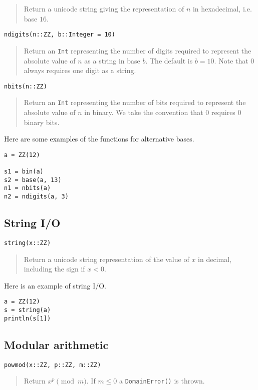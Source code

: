 \documentclass[a4paper,10pt]{article}
\newcommand{\code}{\lstinline}
\newcommand{\desc}[1]{\vspace{-3mm}\begin{quote}#1\end{quote}}
\begin{document}
{{{\desc{Return a unicode string giving the representation of $n$ in hexadecimal, i.e. base $16$.}

\begin{lstlisting}
ndigits(n::ZZ, b::Integer = 10)
\end{lstlisting}

\desc{Return an \code{Int} representing the number of digits required to represent the
absolute value of $n$ as a string in base $b$. The default is $b = 10$. Note that $0$
always requires one digit as a string.}

\begin{lstlisting}
nbits(n::ZZ)
\end{lstlisting}

\desc{Return an \code{Int} representing the number of bits required to represent the
absolute value of $n$ in binary. We take the convention that $0$ requires $0$ binary 
bits.}

Here are some examples of the functions for alternative bases.

\begin{lstlisting}
a = ZZ(12)

s1 = bin(a)
s2 = base(a, 13)
n1 = nbits(a)
n2 = ndigits(a, 3)
\end{lstlisting}

\subsection{String I/O}

\begin{lstlisting}
string(x::ZZ)
\end{lstlisting}

\desc{Return a unicode string representation of the value of $x$ in decimal, including the sign
if $x < 0$.}

Here is an example of string I/O.

\begin{lstlisting}
a = ZZ(12)
s = string(a)
println(s[1])
\end{lstlisting}

\subsection{Modular arithmetic}

\begin{lstlisting}
powmod(x::ZZ, p::ZZ, m::ZZ)
\end{lstlisting}

\desc{Return $x^p \pmod{m}$. If $m \leq 0$ a \code{DomainError()} is thrown.}

}}}
\end{document}
